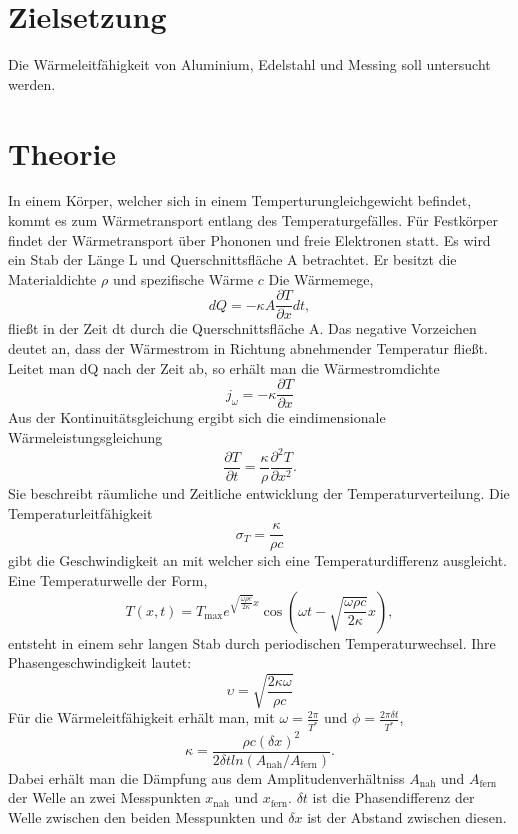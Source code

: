 \section{Zielsetzung}
Die Wärmeleitfähigkeit von Aluminium, Edelstahl und Messing soll untersucht werden.
\section{Theorie}
\label{sec:Theorie}
In einem Körper, welcher sich in einem Temperturungleichgewicht befindet, kommt es zum Wärmetransport entlang des Temperaturgefälles.
Für Festkörper findet der Wärmetransport über Phononen und freie Elektronen statt.
Es wird ein Stab der Länge L und Querschnittsfläche A betrachtet.
Er besitzt die Materialdichte $\rho$ und spezifische Wärme $c$
Die Wärmemege,
\begin{equation}
    dQ =-  \kappa A \frac{\partial T}{\partial x} dt ,
\end{equation}
fließt in der Zeit dt durch die Querschnittsfläche A.
Das negative Vorzeichen deutet an, dass der Wärmestrom in Richtung abnehmender Temperatur fließt.
Leitet man dQ nach der Zeit ab, so erhält man die Wärmestromdichte
\begin{equation}
    j_\omega =- \kappa \frac{\partial T}{\partial x}
\end{equation}
Aus der Kontinuitätsgleichung ergibt sich die eindimensionale Wärmeleistungsgleichung
\begin{equation}
    \frac{\partial T}{\partial t} = \frac {\kappa}{\rho} \frac{\partial^2  T}{\partial x^2} .
\end{equation}
Sie beschreibt räumliche und Zeitliche entwicklung der Temperaturverteilung.
Die Temperaturleitfähigkeit
\begin{equation}
    \sigma_T = \frac{\kappa}{\rho c}
\end{equation}
gibt die Geschwindigkeit an mit welcher sich eine Temperaturdifferenz ausgleicht.
%
Eine Temperaturwelle der Form,
\begin{equation}
    T\left(x,t\right) = T_\text{max}e^{\sqrt{\frac{\omega\rho c}{2 \kappa}}x} \cos\left(\omega t - \sqrt{\frac{\omega\rho c}{2 \kappa}}x\right) ,
\label{eqn:thermowelle}
\end{equation}
entsteht in einem sehr langen Stab durch periodischen Temperaturwechsel.
Ihre Phasengeschwindigkeit lautet:
\begin{equation}
    \upsilon = \sqrt{\frac{2\kappa\omega}{\rho c}}
\end{equation}
Für die Wärmeleitfähigkeit erhält man, mit  $\omega=\frac{2\pi}{T^*}$ und $\phi=\frac{2\pi\delta t}{T^*}$,
\begin{equation}
    \kappa = \frac{\rho c\left(\delta x\right)^2}{2\delta t ln\left(A_\text{nah}/A_\text{fern}\right)}  .
\end{equation}
Dabei erhält man die Dämpfung aus dem Amplitudenverhältniss $A_\text{nah}$ und $A_\text{fern}$ der Welle an zwei Messpunkten 
$x_\text{nah}$ und $x_\text{fern}$.
$\delta t$ ist die Phasendifferenz der Welle zwischen den beiden Messpunkten und $\delta x$ ist der Abstand zwischen diesen.
